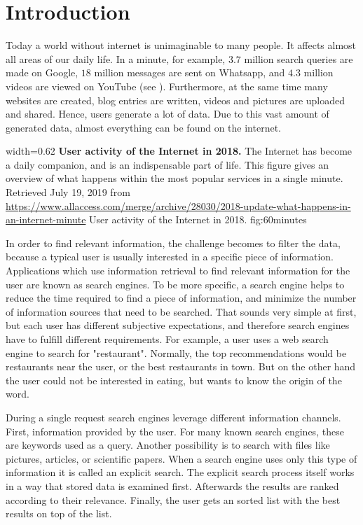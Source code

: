 \chapter{Introduction}
\label{cha:introduction}

Today a world without internet is unimaginable to many people. It affects almost all areas of our daily life. In a minute, for example, $3.7$ million search queries are made on Google, $18$ million messages are sent on Whatsapp, and $4.3$ million videos are viewed on YouTube (see ). Furthermore, at the same time many websites are created, blog entries are written, videos and pictures are uploaded and shared. Hence, users generate a lot of data. Due to this vast amount of generated data, almost everything can be found on the internet.

      {width=0.62\textwidth}
      {\textbf{User activity of the Internet in 2018.} The Internet has become a daily companion, and is an indispensable part of life. This figure gives an overview of what happens within the most popular services in a single minute. Retrieved July 19, 2019 from \url{https://www.allaccess.com/merge/archive/28030/2018-update-what-happens-in-an-internet-minute}}
      {User activity of the Internet in 2018.}
      {fig:60minutes}

In order to find relevant information, the challenge becomes to filter the data, because a typical user is usually interested in a specific piece of information. Applications which use information retrieval to find relevant information for the user are known as search engines. To be more specific, a search engine helps to reduce the time required to find a piece of information, and minimize the number of information sources that need to be searched. That sounds very simple at first, but each user has different subjective expectations, and therefore search engines have to fulfill different requirements. For example, a user uses a web search engine to search for "restaurant". Normally, the top recommendations would be restaurants near the user, or the best restaurants in town. But on the other hand the user could not be interested in eating, but wants to know the origin of the word.

During a single request search engines leverage different information channels. First, information provided by the user. For many known search engines, these are keywords used as a query. Another possibility is to search with files like pictures, articles, or scientific papers. When a search engine uses only this type of information it is called an explicit search. The explicit search process itself works in a way that stored data is examined first. Afterwards the results are ranked according to their relevance. Finally, the user gets an sorted list with the best results on top of the list.


